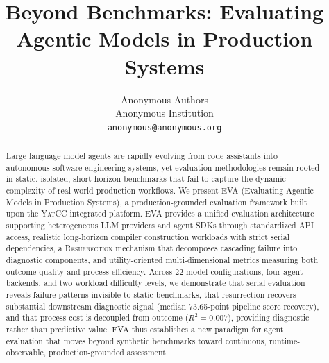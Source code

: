 \documentclass{article}
\title{Beyond Benchmarks: Evaluating Agentic Models in Production Systems}
\author{Anonymous Authors \\ Anonymous Institution \\ \texttt{anonymous@anonymous.org}}
\newcommand{\eva}{\textsc{EVA}}
\newcommand{\yatcc}{\textsc{YatCC}}
\newcommand{\resurrection}{\textsc{Resurrection}}
\begin{document}
\ifcolmsubmission
\linenumbers
\fi

\maketitle

\begin{abstract}
Large language model agents are rapidly evolving from code assistants into autonomous software engineering systems, yet evaluation methodologies remain rooted in static, isolated, short-horizon benchmarks that fail to capture the dynamic complexity of real-world production workflows. We present \eva{} (Evaluating Agentic Models in Production Systems), a production-grounded evaluation framework built upon the \yatcc{} integrated platform. \eva{} provides a unified evaluation architecture supporting heterogeneous LLM providers and agent SDKs through standardized API access, realistic long-horizon compiler construction workloads with strict serial dependencies, a \resurrection{} mechanism that decomposes cascading failure into diagnostic components, and utility-oriented multi-dimensional metrics measuring both outcome quality and process efficiency. Across 22 model configurations, four agent backends, and two workload difficulty levels, we demonstrate that serial evaluation reveals failure patterns invisible to static benchmarks, that resurrection recovers substantial downstream diagnostic signal (median 73.65-point pipeline score recovery), and that process cost is decoupled from outcome ($R^2 = 0.007$), providing diagnostic rather than predictive value. \eva{} thus establishes a new paradigm for agent evaluation that moves beyond synthetic benchmarks toward continuous, runtime-observable, production-grounded assessment.
\end{abstract}









\appendix


\end{document}
